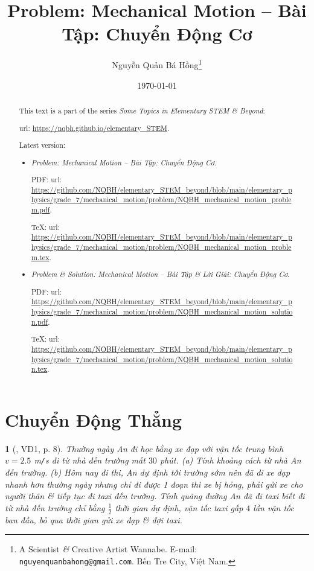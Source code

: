 \documentclass{article}
\title{Problem: Mechanical Motion -- Bài Tập: Chuyển Động Cơ}
\author{Nguyễn Quản Bá Hồng\footnote{A Scientist {\it\&} Creative Artist Wannabe. E-mail: {\tt nguyenquanbahong@gmail.com}. Bến Tre City, Việt Nam.}}
\date{\today}
\newtheorem{baitoan}{}
\begin{document}
\maketitle
\begin{abstract}
	This text is a part of the series {\it Some Topics in Elementary STEM \& Beyond}:
	
	{\sc url}: \url{https://nqbh.github.io/elementary_STEM}.
	
	Latest version:
	\begin{itemize}
		\item {\it Problem: Mechanical Motion -- Bài Tập: Chuyển Động Cơ}.
		
		PDF: {\sc url}: \url{https://github.com/NQBH/elementary_STEM_beyond/blob/main/elementary_physics/grade_7/mechanical_motion/problem/NQBH_mechanical_motion_problem.pdf}.
		
		\TeX: {\sc url}: \url{https://github.com/NQBH/elementary_STEM_beyond/blob/main/elementary_physics/grade_7/mechanical_motion/problem/NQBH_mechanical_motion_problem.tex}.
		\item {\it Problem \& Solution: Mechanical Motion -- Bài Tập \& Lời Giải: Chuyển Động Cơ}.
		
		PDF: {\sc url}: \url{https://github.com/NQBH/elementary_STEM_beyond/blob/main/elementary_physics/grade_7/mechanical_motion/problem/NQBH_mechanical_motion_solution.pdf}.
		
		\TeX: {\sc url}: \url{https://github.com/NQBH/elementary_STEM_beyond/blob/main/elementary_physics/grade_7/mechanical_motion/problem/NQBH_mechanical_motion_solution.tex}.
	\end{itemize}
\end{abstract}
\tableofcontents


\section{Chuyển Động Thẳng}

\begin{baitoan}[\cite{Van_Quyen_Hanh_Nhu_10_chuyen_Ly}, VD1, p. 8]
	Thường ngày An đi học bằng xe đạp với vận tốc trung bình $v = 2.5$ {\rm m{\tt/}s} đi từ nhà đến trường mất $30$ phút. (a) Tính khoảng cách từ nhà An đến trường. (b) Hôm nay đi thi, An dự định tới trường sớm nên đã đi xe đạp nhanh hơn thường ngày nhưng chỉ đi được 1 đoạn thì xe bị hỏng, phải gửi xe cho người thân \& tiếp tục đi taxi đến trường. Tính quãng đường An đã đi taxi biết đi từ nhà đến trường chỉ bằng $\frac{1}{2}$ thời gian dự định, vận tốc taxi gấp $4$ lần vận tốc ban đầu, bỏ qua thời gian gửi xe đạp \& đợi taxi.
\end{baitoan}
\end{document}
